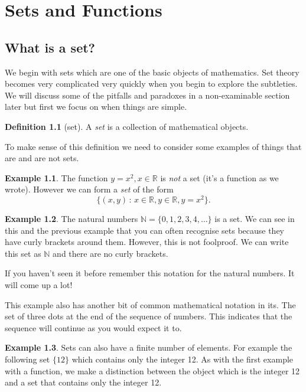 \documentclass[
]{book}
\theoremstyle{definition}
\newtheorem{definition}{Definition}[chapter]
\theoremstyle{definition}
\newtheorem{example}{Example}[chapter]
\theoremstyle{definition}
\theoremstyle{definition}
\theoremstyle{remark}
\begin{document}
\chapter{Sets and Functions}\label{sets-and-functions}

\section{What is a set?}\label{what-is-a-set}

We begin with sets which are one of the basic objects of mathematics. Set theory becomes very complicated very quickly when you begin to explore the subtleties. We will discuss some of the pitfalls and paradoxes in a non-examinable section later but first we focus on when things are simple.

\begin{definition}[set]
A \emph{set} is a collection of mathematical objects.
\end{definition}

To make sense of this definition we need to consider some examples of things that are and are not sets.

\begin{example}
The function \(y = x^2, x \in \mathbb{R}\) is \emph{not} a set (it's a function as we wrote). However we can form a \emph{set} of the form \[ \{(x,y)\,:\,  x \in \mathbb{R}, y \in \mathbb{R}, y=x^2 \}.  \]
\end{example}

\begin{example}
The natural numbers \(\mathbb{N} = \{0,1,2, 3, 4, \dots\}\) is a set. We can see in this and the previous example that you can often recognise sets because they have curly brackets around them. However, this is not foolproof. We can write this set as \(\mathbb{N}\) and there are no curly brackets.

If you haven't seen it before remember this notation for the natural numbers. It will come up a lot!

This example also has another bit of common mathematical notation in its. The set of three dots at the end of the sequence of numbers. This indicates that the sequence will continue as you would expect it to.
\end{example}

\begin{example}
Sets can also have a finite number of elements. For example the following set \(\{12\}\) which contains only the integer 12. As with the first example with a function, we make a distinction between the object which is the integer 12 and a set that contains only the integer 12.
\end{example}
\end{document}
